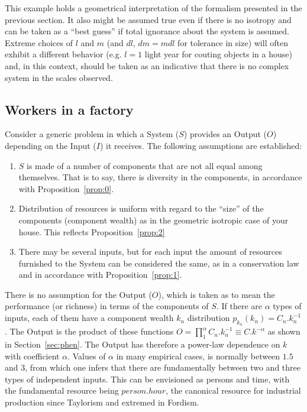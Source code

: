 \documentclass[a4paper, 11pt]{article} %
\begin{document}
This example holds a geometrical
interpretation of the formalism presented in the previous section.
It also might be assumed true even if there is no isotropy
and can be taken as a ``best guess'' if total ignorance
about the system is assumed. 
Extreme choices of $l$ and $m$ (and $dl$, $dm=mdl$ for tolerance in size)
will often exhibit a different behavior (e.g. $l=1$ light year for couting objects in a house) and, in this context, should be taken as an indicative that there is no complex system in the scales observed. 

\subsection{Workers in a factory}
Consider a generic problem in which a System ($S$) provides an Output ($O$) depending on the Input ($I$) it receives.
The following assumptions are established:
\begin{enumerate}
	\item $S$ is made of a number of components that are not all equal among themselves.
That is to say, there is diversity in the components, in accordance with Proposition~\ref{prop:0}. 
\item Distribution of resources is uniform with regard to the ``size'' of the components (component wealth) as in the geometric isotropic case of your house.
This reflects Proposition~\ref{prop:2}
\item There may be several inputs, but for each input the amount of resources furnished to the System can be considered the same,
as in a conservation law and in accordance with Proposition~\ref{prop:1}.
\end{enumerate}

There is no assumption for the Output ($O$), which is taken as to mean the performance (or richness) in terms of the components of $S$.
If there are $\alpha$ types of inputs,
each of them have a component wealth $k_n$ distribution
$p_{k_n}(k_n)=C_n.k_n^{-1}$.
The Output is the product of these functions
$O = \prod_1^{\alpha} C_n.k_n^{-1}\equiv C.k^{-\alpha}$
as shown in Section~\ref{sec:phen}. 
The Output has therefore a power-law dependence on $k$ with coefficient $\alpha$. 
Values of $\alpha$ in many empirical cases,
is normally between $1.5$ and $3$,
from which one infers that there are 
fundamentally between two and three types
of independent inputs.
This can be envisioned as persons and 
time, with the fundamental resource being 
$person . hour$, the canonical resource for 
industrial production since Taylorism
and extremed in Fordism.
\end{document}
